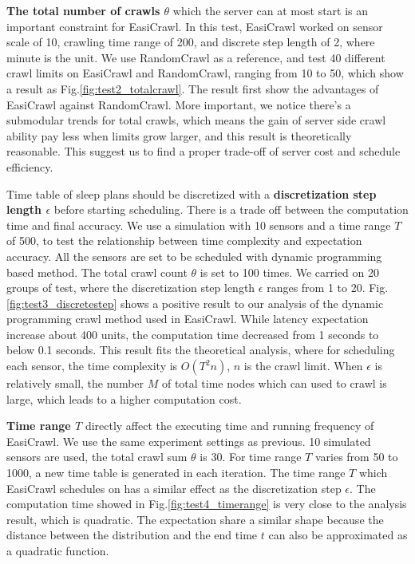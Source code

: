 \documentclass[conference]{IEEEtran}
\begin{document}
\textbf{The total number of crawls $\theta$} which the server can at most start is an important constraint for EasiCrawl. 
In this test, EasiCrawl worked on sensor scale of 10, crawling time range of 200, and discrete step length of 2, where minute is the unit. We use RandomCrawl as a reference, and test 40 different crawl limits on EasiCrawl and RandomCrawl, ranging from 10 to 50, which show a result as Fig.\ref{fig:test2_totalcrawl}.
The result first show the advantages of EasiCrawl against RandomCrawl. More important, we notice there's a submodular trends for total crawls, which means the gain of server side crawl ability pay less when limits grow larger, and this result is theoretically reasonable. This suggest us to find a proper trade-off of server cost and schedule efficiency.

Time table of sleep plans should be discretized with a \textbf{discretization step length $\epsilon$} before starting scheduling. There is a trade off between the computation time and final accuracy. 
We use a simulation with 10 sensors and a time range $T$ of 500, to test the relationship between time complexity and expectation accuracy. All the sensors are set to be scheduled with dynamic programming based method. The total crawl count $\theta$ is set to 100 times.
We carried on 20 groups of test, where the discretization step length $\epsilon$ ranges from 1 to 20.
Fig.\ref{fig:test3_discretestep} shows a positive result to our analysis of the dynamic programming crawl method used in EasiCrawl. While latency expectation increase about 400 units, the computation time decreased from 1 seconds to below 0.1 seconds. This result fits the theoretical analysis, where for scheduling each sensor, the time complexity is $O(T^{2}n)$, $n$ is the crawl limit.
When $\epsilon$ is relatively small, the number $M$ of total time nodes which can used to crawl is large, which leads to a higher computation cost.

\textbf{Time range $T$} directly affect the executing time and running frequency of EasiCrawl.
We use the same experiment settings as previous. 10 simulated sensors are used, the total crawl sum $\theta$ is 30. For time range $T$ varies from 50 to 1000, a new time table is generated in each iteration. The time range $T$ which EasiCrawl schedules on has a similar effect as the discretization step $\epsilon$. 
The computation time showed in Fig.\ref{fig:test4_timerange} is very close to the analysis result, which is quadratic. The expectation share a similar shape because the distance between the distribution and the end time $t$ can also be approximated as a quadratic function.
\end{document}
